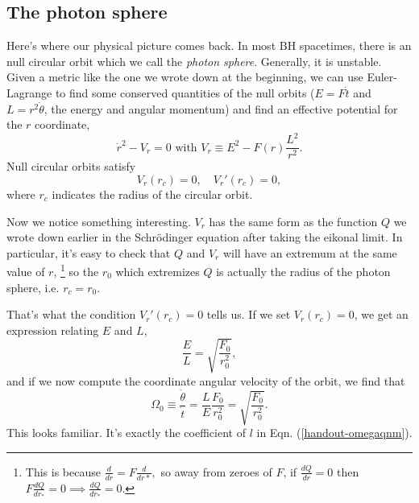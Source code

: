 \documentclass{tufte-handout}
\newcommand{\?}{\overset{?}{=}}
\newcommand{\term}{\emph}
\theoremstyle{definition}
\theoremstyle{remark}
\begin{document}
\subsection{The photon sphere}
Here's where our physical picture comes back. In most BH spacetimes, there is an null circular orbit which we call the \term{photon sphere}. Generally, it is unstable. Given a metric like the one we wrote down at the beginning, we can use Euler-Lagrange to find some conserved quantities of the null orbits ($E=F \dot t$ and $L=r^2 \dot \theta$, the energy and angular momentum) and find an effective potential for the $r$ coordinate,
\begin{equation}
    \dot r^2 - V_r = 0 \text{ with } V_r \equiv E^2 -F(r)\frac{L^2}{r^2}.
\end{equation}
Null circular orbits satisfy
\begin{equation*}
    V_r(r_c) = 0, \quad V_r'(r_c) = 0,
\end{equation*}
where $r_c$ indicates the radius of the circular orbit.

Now we notice something interesting. $V_r$ has the same form as the function $Q$ we wrote down earlier in the Schr\"odinger equation after taking the eikonal limit. In particular, it's easy to check that $Q$ and $V_r$ will have an extremum at the same value of $r$,%
    \footnote{This is because $\frac{d}{dr}=F \frac{d}{dr*},$ so away from zeroes of $F$, if $\frac{dQ}{dr}=0$ then $F\frac{dQ}{dr_*}=0\implies \frac{dQ}{dr_*}=0$.}
so the $r_0$ which extremizes $Q$ is actually the radius of the photon sphere, i.e. $r_c=r_0$.

That's what the condition $V_r'(r_c)=0$ tells us. If we set $V_r(r_c)=0$, we get an expression relating $E$ and $L$,
\begin{equation*}
    \frac{E}{L}=\sqrt{\frac{F_0}{r_0^2}},
\end{equation*}
and if we now compute the coordinate angular velocity of the orbit, we find that
\begin{equation*}
    \Omega_0 \equiv \frac{\dot \theta}{\dot t} = \frac{L}{E} \frac{F_0}{r_0^2} =\sqrt{\frac{F_0}{r_0^2}}.
\end{equation*}
This looks familiar. It's exactly the coefficient of $l$ in Eqn. (\ref{handout-omegaqnm}). 
\end{document}

